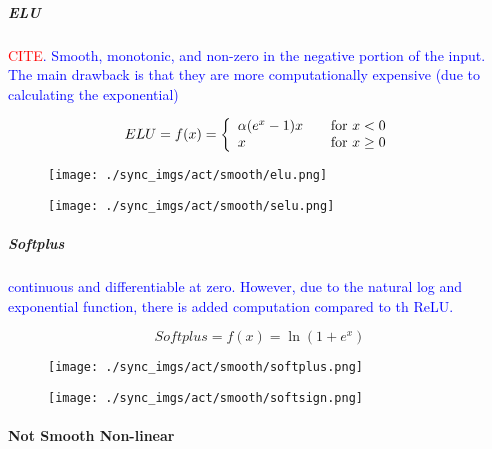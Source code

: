 \subparagraph{ELU}

\textcolor{blue}{\textcolor{red}{CITE}. Smooth, monotonic, and non-zero in the negative portion of the input. The main drawback is that they are more computationally expensive (due to calculating the exponential)}


\begin{equation}
{
	ELU = f(x) = \left\{
	\begin{array}{ll}
	\alpha(e^x - 1) x & \quad $for$ \ x < 0 \\
	x & \quad $for$ \ x \ge 0
	\end{array}
	\right.
}
\label{eq:act_elu_def}
\end{equation}


\begin{figure}
	\centering
	\texttt{[image: ./sync\_imgs/act/smooth/elu.png]}
	\label{fig:act_smooth_elu}
\end{figure}

\begin{figure}
	\centering
	\texttt{[image: ./sync\_imgs/act/smooth/selu.png]}
	\label{fig:act_smooth_selu}
\end{figure}


\subparagraph{Softplus}

\textcolor{blue}{continuous and differentiable at zero. However, due to the natural log and exponential function, there is added computation compared to th ReLU.}


\begin{equation}
{
	Softplus = f(x) = \ln{(1+e^x)}
}
\label{eq:act_softplus_def}
\end{equation}


\begin{figure}
	\centering
	\texttt{[image: ./sync\_imgs/act/smooth/softplus.png]}
	\label{fig:act_smooth_softplus}
\end{figure}

\begin{figure}
	\centering
	\texttt{[image: ./sync\_imgs/act/smooth/softsign.png]}
	\label{fig:act_smooth_softsign}
\end{figure}


\paragraph{Not Smooth Non-linear}

